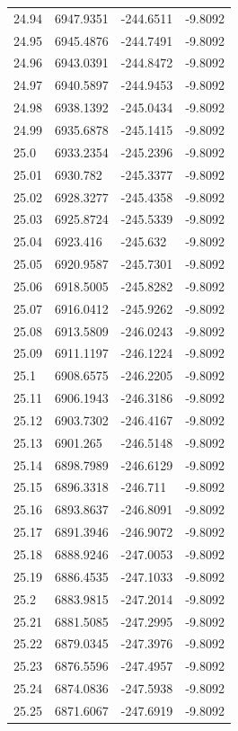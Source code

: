 \begin{table}[H]
\begin{tabular}{llll}
24.94 & 6947.9351 & -244.6511 & -9.8092 \\
24.95 & 6945.4876 & -244.7491 & -9.8092 \\
24.96 & 6943.0391 & -244.8472 & -9.8092 \\
24.97 & 6940.5897 & -244.9453 & -9.8092 \\
24.98 & 6938.1392 & -245.0434 & -9.8092 \\
24.99 & 6935.6878 & -245.1415 & -9.8092 \\
25.0 & 6933.2354 & -245.2396 & -9.8092 \\
25.01 & 6930.782 & -245.3377 & -9.8092 \\
25.02 & 6928.3277 & -245.4358 & -9.8092 \\
25.03 & 6925.8724 & -245.5339 & -9.8092 \\
25.04 & 6923.416 & -245.632 & -9.8092 \\
25.05 & 6920.9587 & -245.7301 & -9.8092 \\
25.06 & 6918.5005 & -245.8282 & -9.8092 \\
25.07 & 6916.0412 & -245.9262 & -9.8092 \\
25.08 & 6913.5809 & -246.0243 & -9.8092 \\
25.09 & 6911.1197 & -246.1224 & -9.8092 \\
25.1 & 6908.6575 & -246.2205 & -9.8092 \\
25.11 & 6906.1943 & -246.3186 & -9.8092 \\
25.12 & 6903.7302 & -246.4167 & -9.8092 \\
25.13 & 6901.265 & -246.5148 & -9.8092 \\
25.14 & 6898.7989 & -246.6129 & -9.8092 \\
25.15 & 6896.3318 & -246.711 & -9.8092 \\
25.16 & 6893.8637 & -246.8091 & -9.8092 \\
25.17 & 6891.3946 & -246.9072 & -9.8092 \\
25.18 & 6888.9246 & -247.0053 & -9.8092 \\
25.19 & 6886.4535 & -247.1033 & -9.8092 \\
25.2 & 6883.9815 & -247.2014 & -9.8092 \\
25.21 & 6881.5085 & -247.2995 & -9.8092 \\
25.22 & 6879.0345 & -247.3976 & -9.8092 \\
25.23 & 6876.5596 & -247.4957 & -9.8092 \\
25.24 & 6874.0836 & -247.5938 & -9.8092 \\
25.25 & 6871.6067 & -247.6919 & -9.8092 \\

\end{tabular}
\end{table}

